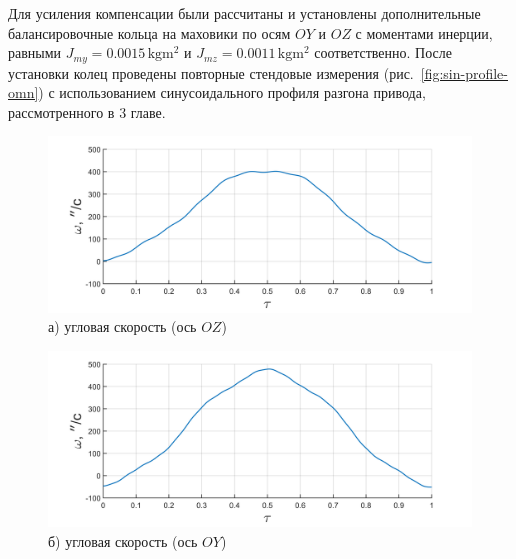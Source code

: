 Для усиления компенсации были рассчитаны и установлены дополнительные балансировочные кольца на маховики  по осям $OY$ и $OZ$ с моментами инерции, равными $J_{my}=\num{0.0015}\,\si{\kilo\gram\meter\squared}$ и $J_{mz}=\num{0.0011}\,\si{\kilo\gram\meter\squared}$ соответственно. После установки колец проведены повторные стендовые измерения (рис.~\cref{fig:sin-profile-omn}) с использованием синусоидального профиля разгона привода, рассмотренного в 3 главе.
\begin{figure}[h!]
	\begin{minipage}[b]{0.49\linewidth}\centering
		\includegraphics[width=\linewidth]{matlab/img/oz-gyro-sin-vel} \\ а) угловая скорость (ось $OZ$)
	\end{minipage}
	\hfill
	\begin{minipage}[b]{0.49\linewidth}\centering
		\includegraphics[width=\linewidth]{matlab/img/oy-gyro-sin-vel} \\ б) угловая скорость (ось $OY$)
	\end{minipage}
	
	\vspace{0.5em} %
	

\end{figure}
